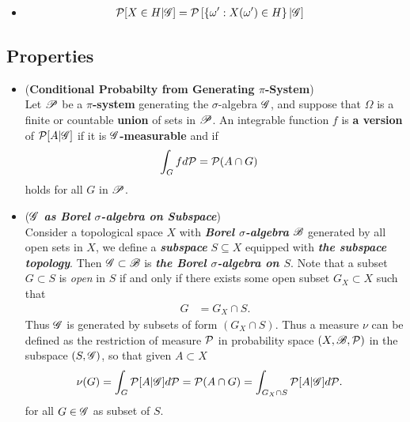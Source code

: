 \documentclass[11pt]{article}
\begin{document}
\begin{itemize}
\item \begin{remark}
\begin{align*}
{\mathcal P}[X \in H | {\mathscr G}] &= {\mathcal P}\left[\left\{\omega': X(\omega') \in H\right\} | {\mathscr G}\right]
\end{align*}
\end{remark}
\end{itemize}
\subsection{Properties}
\begin{itemize}
\item \begin{proposition} (\textbf{Conditional Probabilty from Generating $\pi$-System})\citep{billingsley2008probability}\\
Let ${\mathscr P}$ be a \textbf{$\pi$-system} generating the $\sigma$-algebra ${\mathscr G}$, and suppose that $\Omega$ is a finite or countable \textbf{union} of sets in ${\mathscr P}$. An integrable function $f$ is \textbf{a version} of ${\mathcal P}[A | {\mathscr G}]$ if it is \textbf{${\mathscr G}$-measurable} and if
\begin{align*}
\int_{G} f d{\mathcal P} &= {\mathcal P}(A \cap G)
\end{align*}
holds for all $G$ in ${\mathscr P}$.
\end{proposition}

\item \begin{remark} (\textbf{\emph{${\mathscr G}$ as Borel $\sigma$-algebra on Subspace}})\\
Consider a topological space $X$ with \emph{\textbf{Borel $\sigma$-algebra}} ${\mathscr B}$ generated by all open sets in $X$, we define a \emph{\textbf{subspace}} $S \subseteq X$ equipped with \emph{\textbf{the subspace topology}}. Then ${\mathscr G} \subset {\mathscr B}$ is \emph{\textbf{the Borel $\sigma$-algebra on $S$}}. Note that a subset $G \subset S$ is \emph{open} in $S$ if and only if there exists some open subset $G_X \subset X$ such that 
\begin{align*}
G &= G_X \cap S.
\end{align*} Thus ${\mathscr G}$ is generated by subsets of form $(G_X \cap S)$. Thus a measure $\nu$ can be defined as the restriction of measure ${\mathcal P}$ in probability space $(X, {\mathscr B}, {\mathcal P})$ in the subspace $(S, {\mathscr G})$, so that given $A \subset X$
\begin{align*}
\nu(G) = \int_{G}{\mathcal P}[A | {\mathscr G}] d{\mathcal P} &={\mathcal P}(A \cap G) = \int_{G_X \cap S}{\mathcal P}[A | {\mathscr G}] d{\mathcal P}.
\end{align*} for all $G \in {\mathscr G}$ as subset of $S$.
\end{remark}


\end{itemize}
\end{document}
